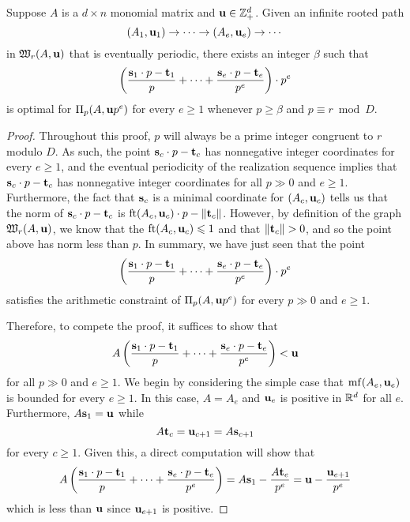 \documentclass[11pt]{amsart}
\renewcommand{\!}[1]{{\color{red}\text{$\star$\,}#1\,$\star$}}
\begin{document}
\newpage


\begin{proposition}
Suppose $A$ is a $d \times n$ monomial matrix and $\mathbf{u} \in \mathbb{Z}^d_+$.  Given an infinite rooted path 
\[ (A_1, \mathbf{u}_1) \to \cdots \to (A_e, \mathbf{u}_e) \to \cdots \] in $\mathfrak{W}_r(A, \mathbf{u})$ 
that is eventually periodic, there exists an integer $\beta$ such that 
\[  \left( \frac{ \mathbf{s}_1 \cdot p - \mathbf{t}_1}{p} + \cdots + \frac{ \mathbf{s}_e \cdot p - \mathbf{t}_e}{p^e} \right) \cdot p^e \] 
is optimal for $\Pi_p(A, \mathbf{u}p^e)$ for every $e \geq 1$ whenever $p \geq \beta$ and $p \equiv r \bmod D$.
\end{proposition}

\begin{proof}   Throughout this proof, $p$ will always be a prime integer congruent to $r$ modulo $D$.  As such, the point $\mathbf{s}_c \cdot p - \mathbf{t}_c$  has nonnegative integer coordinates for every $e \geq 1$, and the eventual periodicity of the realization sequence implies that $\mathbf{s}_c \cdot p - \mathbf{t}_c$ has nonnegative integer coordinates for all $p \gg 0$ and $e \geq 1$.   Furthermore, the fact that $\mathbf{s}_c$ is a minimal coordinate for $(A_c, \mathbf{u}_c)$ tells us that the norm of $\mathbf{s}_c \cdot p - \mathbf{t}_c$ is $\operatorname{ft}(A_c, \mathbf{u}_c) \cdot p - \| \mathbf{t}_c \|$.  However, by definition of the graph $\mathfrak{W}_r(A, \mathbf{u})$, we know that the $\operatorname{ft}(A_c, \mathbf{u}_c) \leqslant 1$ and that $\| \mathbf{t}_c \| > 0$, and so the point above has norm less than $p$.  In summary, we have just seen that the point
\[  \left( \frac{ \mathbf{s}_1 \cdot p - \mathbf{t}_1}{p} + \cdots + \frac{ \mathbf{s}_e \cdot p - \mathbf{t}_e}{p^e} \right) \cdot p^e \] satisfies the arithmetic constraint of $\Pi_p(A, \mathbf{u}p^e)$ for every $p \gg 0$ and $e \geq 1$.  

Therefore, to compete the proof, it suffices to show that 
\begin{equation}
\label{goal: e}
A   \left( \frac{ \mathbf{s}_1 \cdot p - \mathbf{t}_1}{p} + \cdots + \frac{ \mathbf{s}_e \cdot p - \mathbf{t}_e}{p^e} \right) < \mathbf{u} 
\end{equation}
for all $p \gg 0$ and $e \geq 1$.  We begin by considering the simple case that $\operatorname{mf}(A_e, \mathbf{u}_e)$ is bounded for every $e \geq 1$.  In this case, $A = A_e$ and $\mathbf{u}_e$ is positive in $\mathbb{R}^d$ for all $e$.  Furthermore, $A \mathbf{s}_1 = \mathbf{u}$ while \[ A \mathbf{t}_c = \mathbf{u}_{c+1} = A \mathbf{s}_{c+1} \] for every $c \geq 1$.   Given this, a direct computation will show that 
\[ A   \left( \frac{ \mathbf{s}_1 \cdot p - \mathbf{t}_1}{p} + \cdots + \frac{ \mathbf{s}_e \cdot p - \mathbf{t}_e}{p^e} \right)  = A \mathbf{s}_1 - \frac{A \mathbf{t}_e}{p^e} = \mathbf{u} - \frac{\mathbf{u}_{e+1}}{p^e} \] which is less than $\mathbf{u}$ since $\mathbf{u}_{e+1}$ is positive.  




\end{proof}
\end{document}
